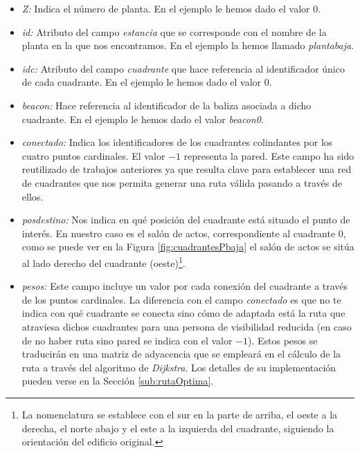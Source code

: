 \begin{itemize}
	\item \textit{Z:} Indica el número de planta. En el ejemplo le hemos dado el valor $0$.
	
	\item \textit{id:} Atributo del campo \textit{estancia} que se corresponde con el nombre de la planta en la que nos encontramos. En el ejemplo la hemos llamado \textit{plantabaja}.
	
	\item \textit{idc:} Atributo del campo \textit{cuadrante} que hace referencia al identificador único de cada cuadrante. En el ejemplo le hemos dado el valor $0$.
	
	\item \textit{beacon:} Hace referencia al identificador de la baliza asociada a dicho cuadrante. En el ejemplo le hemos dado el valor \textit{beacon0}.
	
	\item \textit{conectado:} Indica los identificadores de los cuadrantes colindantes por los cuatro puntos cardinales. El valor $-1$ representa la pared. Este campo ha sido reutilizado de trabajos anteriores ya que resulta clave para establecer una red de cuadrantes que nos permita generar una ruta válida pasando a través de ellos.
	
	\item \textit{posdestino:} Nos indica en qué posición del cuadrante está situado el punto de interés. En nuestro caso es el salón de actos, correspondiente al cuadrante $0$, como se puede ver en la Figura \ref{fig:cuadrantesPbaja} el salón de actos se sitúa al lado derecho del cuadrante (oeste)\footnote{La nomenclatura se establece con el sur en la parte de arriba, el oeste a la derecha, el norte abajo y el este a la izquierda del cuadrante, siguiendo la orientación del edificio original.}.
	
	\item \textit{pesos:} Este campo incluye un valor por cada conexión del cuadrante a través de los puntos cardinales. La diferencia con el campo \textit{conectado} es que no te indica con qué cuadrante se conecta sino cómo de adaptada está la ruta que atraviesa dichos cuadrantes para una persona de visibilidad reducida (en caso de no haber ruta sino pared se indica con el valor $-1$). Estos pesos se traducirán en una matriz de adyacencia que se empleará en el cálculo de la ruta a través del algoritmo de \textit{Dijkstra}. Los detalles de su implementación pueden verse en la Sección \ref{sub:rutaOptima}.
	

\end{itemize}
